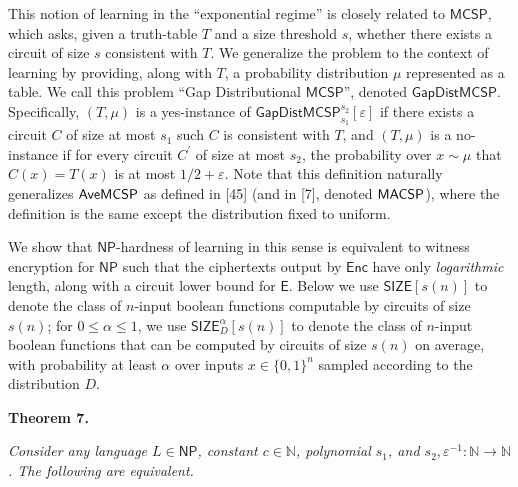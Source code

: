 \documentclass[10pt,a4paper]{article}
\begin{document}
This notion of learning in the “exponential regime” is closely related to ${\mathsf{MCSP}}$, which asks, given a truth-table $T$ and a size threshold $s$, whether there exists a circuit of size $s$ consistent with $T$. We generalize the problem to the context of learning by providing, along with $T$, a probability distribution $\mu$ represented as a table. We call this problem “Gap Distributional ${\mathsf{MCSP}}$”, denoted ${\mathsf{GapDistMCSP}}$. Specifically, $(T,\mu)$ is a yes-instance of ${\mathsf{GapDistMCSP}}_{s_{1}}^{s_{2}}[\varepsilon]$ if there exists a circuit $C$ of size at most $s_{1}$ such $C$ is consistent with $T$, and $(T,\mu)$ is a no-instance if for every circuit $C^{\prime}$ of size at most $s_{2}$, the probability over $x\sim\mu$ that $C(x)=T(x)$ is at most $1/2+\varepsilon$. Note that this definition naturally generalizes ${\sf Ave}{\mathsf{MCSP}}$ as defined in [45] (and in [7], denoted ${\sf MACSP}$), where the definition is the same except the distribution fixed to uniform.\par




We show that ${\mathsf{NP}}$-hardness of learning in this sense is equivalent to witness encryption for ${\mathsf{NP}}$ such that the ciphertexts output by ${\mathsf{Enc}}$ have only \emph{logarithmic} length, along with a circuit lower bound for ${\mathsf{E}}$. Below we use ${\mathsf{SIZE}}[s(n)]$ to denote the class of $n$-input boolean functions computable by circuits of size $s(n)$; for $0\leq\alpha\leq 1$, we use ${\mathsf{SIZE}}_{D}^{\alpha}[s(n)]$ to denote the class of $n$-input boolean functions that can be computed by circuits of size $s(n)$ on average, with probability at least $\alpha$ over inputs $x\in\{0,1\}^{n}$ sampled according to the distribution $D$.\par





\par\medskip\noindent\textbf{
\textbf{Theorem 7}\textbf{.}
}\par



\emph{Consider any language $L\in{\mathsf{NP}}$, constant $c\in\mathbb{N}$, polynomial $s_{1}$, and $s_{2},\varepsilon^{-1}:\mathbb{N}\to\mathbb{N}$. The following are equivalent.}\par
\end{document}
